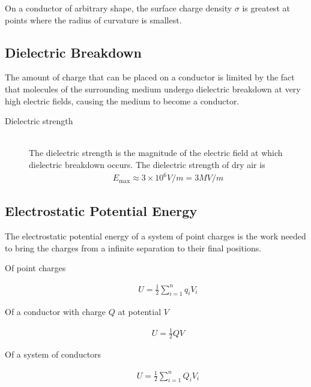\documentclass[../main.tex]{subfiles}
\begin{document}
On a conductor of arbitrary shape, the surface charge density $\sigma$ is
greatest at points where the radius of curvature is smallest.

\subsection{Dielectric Breakdown}
\label{sub:dielectric_breakdown}

The amount of charge that can be placed on a conductor is limited by the fact
that molecules of the surrounding medium undergo dielectric breakdown at very
high electric fields, causing the medium to become a conductor.

\begin{description}
  \item[Dielectric strength] \hfill \\
    The dielectric strength is the magnitude of the electric field at which
    dielectric breakdown occurs. The dielectric strength of dry air is
    \begin{align}
      E_{\text{max}} \approx 3\times10^6V/m = 3MV/m
    \end{align}
\end{description}

\subsection{Electrostatic Potential Energy}
\label{sub:electrostatic_potential_energy}

The electrostatic potential energy of a system of point charges is the work
needed to bring the charges from a infinite separation to their final
positions.

\begin{description}
  \item[Of point charges]
    \begin{align}
      U = \frac{1}{2}\sum_{i=1}^{n}q_iV_i
    \end{align}
  \item[Of a conductor with charge $Q$ at potential $V$]
    \begin{align}
      U = \frac{1}{2}QV
    \end{align}
  \item[Of a system of conductors]
    \begin{align}
      U = \frac{1}{2}\sum_{i=1}^{n}Q_iV_i
    \end{align}
\end{description}
\end{document}
